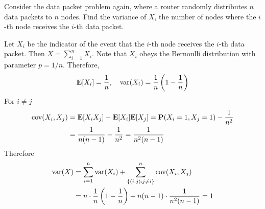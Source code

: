 \documentclass[device=normal, lang=en]{elegantbook}
\numberwithin{equation}{section}
\begin{document}
\begin{example}
    Consider the data packet problem again, where a router randomly distributes $n$ data packets to $n$ nodes. Find the variance of $X$, the number of nodes where the $i$-th node receives the $i$-th data packet.
\end{example}
\begin{solution}
    Let $X_i$ be the indicator of the event that the $i$-th node receives the $i$-th data packet. Then $X = \sum_{i=1}^{n} X_i$. Note that $X_i$ obeys the Bernoulli distribution with parameter $p = 1/n$. Therefore, 
    \begin{equation}
        \mathbf{E}[X_i] = \frac{1}{n}, \quad \mathrm{var}(X_i) = \frac{1}{n}\left(1 - \frac{1}{n}\right)
    \end{equation}
    For $i \neq j$
    \begin{equation}
    \begin{aligned}
        \mathrm{cov}(X_i, X_j) &= \mathbf{E}[X_i X_j] - \mathbf{E}[X_i]\mathbf{E}[X_j] = \mathbf{P}(X_i = 1, X_j = 1) - \frac{1}{n^2} \\ 
        &= \frac{1}{n(n-1)} - \frac{1}{n^2} = \frac{1}{n^2(n-1)}
    \end{aligned}
    \end{equation}
    Therefore
    \begin{equation}
    \begin{aligned}
        \mathrm{var}(X) &= \sum_{i=1}^{n} \mathrm{var}(X_i) + \sum_{\{(i,j): j \neq i\}}^{n} \mathrm{cov}(X_i, X_j) \\ 
        &= n \cdot \frac{1}{n}\left(1 - \frac{1}{n}\right) + n(n-1) \cdot \frac{1}{n^2(n-1)} = 1
    \end{aligned}
    \end{equation}
\end{solution}
\end{document}
